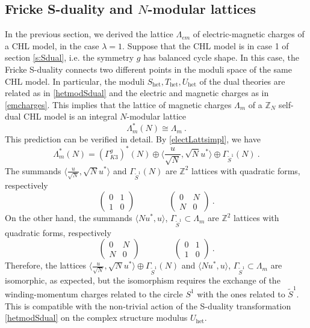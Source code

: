 \documentclass[a4paper,11pt]{article}
\newcommand{\ZZ}{\mathbb{Z}}
\numberwithin{equation}{section}
\def\be{\begin{equation}}
\def\ee{\end{equation}}
\begin{document}
\subsection{Fricke S-duality and $N$-modular lattices}\label{s:Nmodular}

In the previous section, we derived the lattice $\Lambda_{em}$ of electric-magnetic charges of  a CHL model, in the case $\lambda=1$. Suppose that the CHL model is in case 1 of section \ref{s:Sdual}, i.e. the symmetry $g$ has balanced cycle shape.  In this case, the Fricke S-duality connects two different points in the moduli space of the same CHL model. In particular, the moduli $S_{\text{het}},T_{\text{het}},U_{\text{het}}$ of the dual theories are related as in \eqref{hetmodSdual} and the electric and magnetic charges as in \eqref{emcharges}.
This implies that the lattice of magnetic charges $\Lambda_m$ of a $\ZZ_N$ self-dual CHL model is an integral $N$-modular lattice
\be \Lambda_m^*(N)\cong \Lambda_m\ .
\ee
This prediction can be verified in detail. By \eqref{electLattsimpl}, we have
\be \Lambda_m^*(N)=(\Gamma_{K3}^g)^*(N)\oplus \langle \frac{u}{\sqrt{N}}, \sqrt{N}u^*\rangle \oplus \Gamma_{\tilde S^1}(N)\ .
\ee The summands $\langle \frac{u}{\sqrt{N}}, \sqrt{N}u^*\rangle$ and $\Gamma_{\tilde S^1}(N)$ are $\ZZ^2$ lattices with quadratic forms, respectively
\be \begin{pmatrix}
0 & 1 \\ 
1 & 0 \end{pmatrix}\qquad \qquad \begin{pmatrix}
 0 & N\\
 N & 0
\end{pmatrix}\ .
\ee On the other hand, the summands $\langle N u^*, u\rangle$, $ \Gamma_{\tilde S^1}\subset \Lambda_m$ are $\ZZ^2$ lattices with quadratic forms, respectively
\be \begin{pmatrix}
0 & N \\ 
N & 0 \end{pmatrix}\qquad \qquad \begin{pmatrix}
 0 & 1\\
 1 & 0
\end{pmatrix}\ .\ee
Therefore, the lattices $\langle \frac{u}{\sqrt{N}}, \sqrt{N}u^*\rangle\oplus \Gamma_{\tilde S^1}(N)$ and $\langle N u^*, u\rangle$, $ \Gamma_{\tilde S^1}\subset \Lambda_m$ are isomorphic, as expected, but the isomorphism requires the exchange of the winding-momentum charges related to the circle $S^1$ with the ones related to $\tilde S^1$. This is compatible with the non-trivial action of the S-duality transformation \eqref{hetmodSdual} on the complex structure modulus $U_{\text{het}}$.
\end{document}
